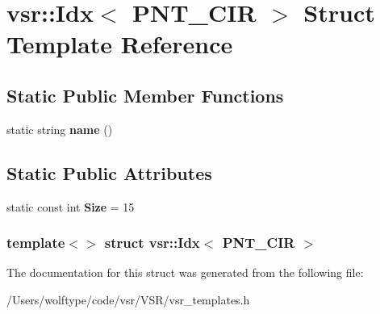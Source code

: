 \hypertarget{structvsr_1_1_idx_3_01_p_n_t___c_i_r_01_4}{\section{vsr\-:\-:Idx$<$ P\-N\-T\-\_\-\-C\-I\-R $>$ Struct Template Reference}
\label{structvsr_1_1_idx_3_01_p_n_t___c_i_r_01_4}
}
\subsection*{Static Public Member Functions}
\begin{DoxyCompactItemize}
\item 
\hypertarget{structvsr_1_1_idx_3_01_p_n_t___c_i_r_01_4_a71b89b9485517a5a2ed414afeb35c7e6}{static string {\bfseries name} ()}\label{structvsr_1_1_idx_3_01_p_n_t___c_i_r_01_4_a71b89b9485517a5a2ed414afeb35c7e6}

\end{DoxyCompactItemize}
\subsection*{Static Public Attributes}
\begin{DoxyCompactItemize}
\item 
\hypertarget{structvsr_1_1_idx_3_01_p_n_t___c_i_r_01_4_a3d3eaed9b81728603f525e45b2aefb20}{static const int {\bfseries Size} = 15}\label{structvsr_1_1_idx_3_01_p_n_t___c_i_r_01_4_a3d3eaed9b81728603f525e45b2aefb20}

\end{DoxyCompactItemize}
\subsubsection*{template$<$$>$ struct vsr\-::\-Idx$<$ P\-N\-T\-\_\-\-C\-I\-R $>$}



The documentation for this struct was generated from the following file\-:\begin{DoxyCompactItemize}
\item 
/\-Users/wolftype/code/vsr/\-V\-S\-R/vsr\-\_\-templates.\-h\end{DoxyCompactItemize}

